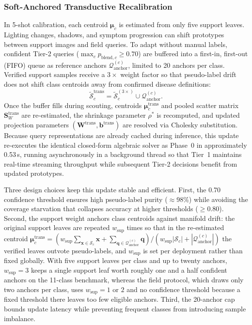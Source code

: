 \documentclass[preprint,12pt]{elsarticle}
\begin{document}
\subsubsection{Soft-Anchored Transductive Recalibration}
\label{sec:transductive}
In 5-shot calibration, each centroid $\boldsymbol{\mu}_c$ is estimated from only five support leaves. Lighting changes, shadows, and symptom progression can shift prototypes between support images and field queries. To adapt without manual labels, confident Tier-2 queries ($\max_c p_{\text{blend}, c} \ge 0.70$) are buffered into a first-in, first-out (FIFO) queue as reference anchors $\mathcal{Q}_{\text{anchor}}^{(c)}$, limited to 20 anchors per class. Verified support samples receive a $3\times$ weight factor so that pseudo-label drift does not shift class centroids away from confirmed disease definitions:
\begin{equation}
    \label{eq:transductive_set}
    \tilde{\mathcal{S}}_c^{\text{trans}} = \tilde{\mathcal{S}}_c^{(3\times)} \cup \mathcal{Q}_{\text{anchor}}^{(c)}.
\end{equation}
Once the buffer fills during scouting, centroids $\boldsymbol{\mu}_c^{\text{trans}}$ and pooled scatter matrix $\mathbf{S}_W^{\text{trans}}$ are re-estimated, the shrinkage parameter $\rho^*$ is recomputed, and updated projection parameters $(\mathbf{W}^{\text{trans}}, \mathbf{b}^{\text{trans}})$ are resolved via Cholesky substitution. Because query representations are already cached during inference, this update re-executes the identical closed-form algebraic solver as Phase~0 in approximately 0.53\,s, running asynchronously in a background thread so that Tier~1 maintains real-time streaming throughput while subsequent Tier-2 decisions benefit from updated prototypes.

Three design choices keep this update stable and efficient. First, the 0.70 confidence threshold ensures high pseudo-label purity ($\approx$98\%) while avoiding the coverage starvation that collapses accuracy at higher thresholds ($\ge$0.80). Second, the support weight anchors class centroids against manifold drift: the original support leaves are repeated $w_{\mathrm{sup}}$ times so that in the re-estimated centroid
$\boldsymbol{\mu}_c^{\text{trans}} = (w_{\mathrm{sup}}\sum_{\mathbf{x}\in\mathcal{S}_c}\mathbf{x} + \sum_{\mathbf{q}\in\mathcal{Q}_{\text{anchor}}^{(c)}}\mathbf{q}) / (w_{\mathrm{sup}}|\mathcal{S}_c| + |\mathcal{Q}_{\text{anchor}}^{(c)}|)$
the verified leaves outvote pseudo-labels, and $w_{\mathrm{sup}}$ is set per deployment rather than fixed globally. With five support leaves per class and up to twenty anchors, $w_{\mathrm{sup}}=3$ keeps a single support leaf worth roughly one and a half confident anchors on the 11-class benchmark, whereas the field protocol, which draws only two anchors per class, uses $w_{\mathrm{sup}}=1$ or $2$ and no confidence threshold because a fixed threshold there leaves too few eligible anchors. Third, the 20-anchor cap bounds update latency while preventing frequent classes from introducing sample imbalance.
\end{document}
